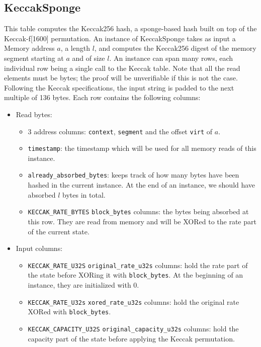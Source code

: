 \subsection{KeccakSponge}
\label{keccak-sponge}

This table computes the Keccak256 hash, a sponge-based hash built on top of the Keccak-f[1600] permutation. An instance of KeccakSponge takes as input a Memory address $a$,
a length $l$, and computes the Keccak256 digest of the memory segment starting at $a$ and of size $l$. An instance can span many rows, each individual row being a single call to
the Keccak table. Note that all the read elements must be bytes; the proof will be unverifiable if this is not the case. Following the Keccak specifications, the input string is padded to the next multiple of 136 bytes. 
Each row contains the following columns:
\begin{itemize}
    \item Read bytes:
        \begin{itemize}
            \item 3 address columns: \texttt{context}, \texttt{segment} and the offset \texttt{virt} of $a$.
            \item \texttt{timestamp}: the timestamp which will be used for all memory reads of this instance.
            \item \texttt{already\_absorbed\_bytes}: keeps track of how many bytes have been hashed in the current instance. At the end of an instance, we should have absorbed $l$ bytes in total.
            \item \texttt{KECCAK\_RATE\_BYTES} \texttt{block\_bytes} columns: the bytes being absorbed at this row. They are read from memory and will be XORed to the rate part of the current state.
        \end{itemize}
    \item Input columns:
    \begin{itemize}
        \item \texttt{KECCAK\_RATE\_U32S} \texttt{original\_rate\_u32s} columns: hold the rate part of the state before XORing it with \texttt{block\_bytes}. At the beginning of an instance, they are initialized with 0.
        \item \texttt{KECCAK\_RATE\_U32s} \texttt{xored\_rate\_u32s} columns: hold the original rate XORed with \texttt{block\_bytes}.
        \item \texttt{KECCAK\_CAPACITY\_U32S} \texttt{original\_capacity\_u32s} columns: hold the capacity part of the state before applying the Keccak permutation.

\end{itemize}
\end{itemize}
